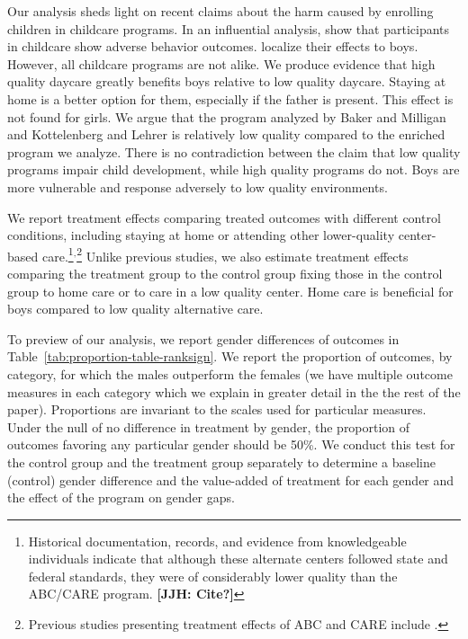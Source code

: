 Our analysis sheds light on recent claims about the harm caused by enrolling children in childcare programs. In an influential analysis, \citet{Baker_Gruber_etal_2008_JPE} show that participants in childcare show adverse behavior outcomes. \citet{Kottelenberg-Lehrer_2014_Gender-Effects} localize their effects to boys. However, all childcare programs are not alike. We produce evidence that high quality daycare greatly benefits boys relative to low quality daycare. Staying at home is a better option for them, especially if the father is present. This effect is not found for girls. We argue that the program analyzed by Baker and Milligan and Kottelenberg and Lehrer is relatively low quality compared to the enriched program we analyze. There is no contradiction between the claim that low quality programs impair child development, while high quality programs do not. Boys are more vulnerable and response adversely to low quality environments.

We report treatment effects comparing treated outcomes with different control conditions, including staying at home or attending other lower-quality center-based care.\footnote{Historical documentation, records, and evidence from knowledgeable individuals indicate that although these alternate centers followed state and federal standards, they were of considerably lower quality than the ABC/CARE program. \textbf{[JJH: Cite?]}}$^,$\footnote{Previous studies presenting treatment effects of ABC and CARE include \citet{Ramey_etal_1985_Project-CARE_TiECSE,Clarke_Campbell_1998_ABC_Comparison_ECRQ,Campbell_Pungello_etal_2001_DP,Campbell_Ramey_etal_2002_ADS,Campbell_Wasik_etal_2008_ECRQ,Campbell_Conti_etal_2014_EarlyChildhoodInvestments}.} Unlike previous studies, we also estimate treatment effects comparing the treatment group to the control group fixing those in the control group to home care or to care in a low quality center. Home care is beneficial for boys compared to low quality alternative care.

To preview of our analysis, we report gender differences of outcomes in Table~\ref{tab:proportion-table-ranksign}. We report the proportion of outcomes, by category, for which the males outperform the females (we have multiple outcome measures in each category which we explain in greater detail in the the rest of the paper). Proportions are invariant to the scales used for particular measures. Under the null of no difference in treatment by gender, the proportion of outcomes favoring any particular gender should be 50\%. We conduct this test for the control group and the treatment group separately to determine a baseline (control) gender difference and the value-added of treatment for each gender and the effect of the program on gender gaps.

